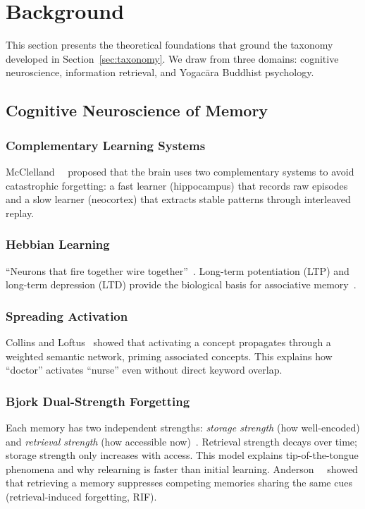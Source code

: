 \section{Background}
\label{sec:background}

This section presents the theoretical foundations that ground the
taxonomy developed in Section~\ref{sec:taxonomy}. We draw from three
domains: cognitive neuroscience, information retrieval, and Yogac\=ara
Buddhist psychology.

\subsection{Cognitive Neuroscience of Memory}

\subsubsection{Complementary Learning Systems}
McClelland~\etal~\cite{mcclelland1995} proposed that the brain uses two
complementary systems to avoid catastrophic forgetting: a fast learner
(hippocampus) that records raw episodes and a slow learner (neocortex)
that extracts stable patterns through interleaved replay.

\subsubsection{Hebbian Learning}
``Neurons that fire together wire together''~\cite{hebb1949}. Long-term
potentiation (LTP) and long-term depression (LTD) provide the
biological basis for associative memory~\cite{bliss1973}.

\subsubsection{Spreading Activation}
Collins and Loftus~\cite{collins1975} showed that activating a concept
propagates through a weighted semantic network, priming associated
concepts. This explains how ``doctor'' activates ``nurse'' even without
direct keyword overlap.

\subsubsection{Bjork Dual-Strength Forgetting}
Each memory has two independent strengths: \emph{storage strength} (how
well-encoded) and \emph{retrieval strength} (how accessible
now)~\cite{bjork1992}. Retrieval strength decays over time; storage
strength only increases with access. This model explains tip-of-the-tongue
phenomena and why relearning is faster than initial
learning. Anderson~\etal~\cite{anderson1994} showed that retrieving a
memory suppresses competing memories sharing the same cues
(retrieval-induced forgetting, RIF).

